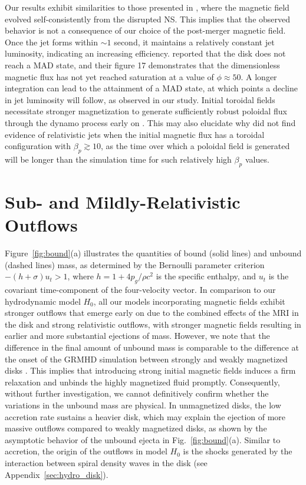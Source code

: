 \documentclass[twocolumn,dvipsnames]{aastex62}
\begin{document}
Our results exhibit similarities to those presented in \citet{Hayashi2022a,Hayashi2022b}, where the magnetic field evolved self-consistently from the disrupted NS. This implies that the observed behavior is not a consequence of our choice of the post-merger magnetic field. Once the jet forms within $ \sim 1 $ second, it maintains a relatively constant jet luminosity, indicating an increasing efficiency. \citet{Hayashi2022b} reported that the disk does not reach a MAD state, and their figure 17 demonstrates that the dimensionless magnetic flux has not yet reached saturation at a value of $ \phi \approx 50 $. A longer integration can lead to the attainment of a MAD state, at which points a decline in jet luminosity will follow, as observed in our study. Initial toroidal fields necessitate stronger magnetization to generate sufficiently robust poloidal flux through the dynamo process early on \citep{Christie2019}. This may also elucidate why \citet{Ruiz2018,Gottlieb2022d} did not find evidence of relativistic jets when the initial magnetic flux has a toroidal configuration with $ \beta_p \gtrsim 10 $, as the time over which a poloidal field is generated will be longer than the simulation time for such relatively high $ \beta_p $ values.
 
\section{Sub- and Mildly-Relativistic Outflows}\label{sec:ejecta}

Figure~\ref{fig:bound}(a) illustrates the quantities of bound (solid lines) and unbound (dashed lines) mass, as determined by the Bernoulli parameter criterion $ -(h+\sigma)u_t>1 $, where $ h = 1+4p_g/ \rho c^2 $ is the specific enthalpy, and $u_t$ is the covariant time-component of the four-velocity vector. In comparison to our hydrodynamic model $H_0$, all our models incorporating magnetic fields exhibit stronger outflows that emerge early on due to the combined effects of the MRI in the disk and strong relativistic outflows, with stronger magnetic fields resulting in earlier and more substantial ejections of mass. However, we note that the difference in the final amount of unbound mass is comparable to the difference at the onset of the GRMHD simulation between strongly and weakly magnetized disks \citep[see also][]{Hayashi2022a}. This implies that introducing strong initial magnetic fields induces a firm relaxation and unbinds the highly magnetized fluid promptly. Consequently, without further investigation, we cannot definitively confirm whether the variations in the unbound mass are physical. In unmagnetized disks, the low accretion rate sustains a heavier disk, which may explain the ejection of more massive outflows compared to weakly magnetized disks, as shown by the asymptotic behavior of the unbound ejecta in Fig.~\ref{fig:bound}(a). Similar to accretion, the origin of the outflows in model $ H_0 $ is the shocks generated by the interaction between spiral density waves in the disk (see Appendix~\ref{sec:hydro_disk}).
\end{document}
